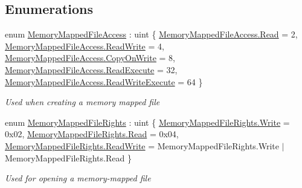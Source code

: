 \subsection*{Enumerations}
\begin{DoxyCompactItemize}
\item 
enum \hyperlink{namespace_system_1_1_i_o_1_1_memory_mapped_files_a19b0f6344fc0a0d04c0f781e1811c976}{Memory\+Mapped\+File\+Access} \+: uint \{ \newline
\hyperlink{namespace_system_1_1_i_o_1_1_memory_mapped_files_a19b0f6344fc0a0d04c0f781e1811c976a7a1a5f3e79fdc91edf2f5ead9d66abb4}{Memory\+Mapped\+File\+Access.\+Read} = 2, 
\hyperlink{namespace_system_1_1_i_o_1_1_memory_mapped_files_a19b0f6344fc0a0d04c0f781e1811c976a70a2a84088d405a2e3f1e3accaa16723}{Memory\+Mapped\+File\+Access.\+Read\+Write} = 4, 
\hyperlink{namespace_system_1_1_i_o_1_1_memory_mapped_files_a19b0f6344fc0a0d04c0f781e1811c976aad9dd22a4a58cbbaaffd8e73443064c3}{Memory\+Mapped\+File\+Access.\+Copy\+On\+Write} = 8, 
\hyperlink{namespace_system_1_1_i_o_1_1_memory_mapped_files_a19b0f6344fc0a0d04c0f781e1811c976a847478398fca6833e50a3ba5255eb2bf}{Memory\+Mapped\+File\+Access.\+Read\+Execute} = 32, 
\newline
\hyperlink{namespace_system_1_1_i_o_1_1_memory_mapped_files_a19b0f6344fc0a0d04c0f781e1811c976a68fbe19a33b2eec8657b4ec31a38ad94}{Memory\+Mapped\+File\+Access.\+Read\+Write\+Execute} = 64
 \}\begin{DoxyCompactList}\small\item\em Used when creating a memory mapped file \end{DoxyCompactList}
\item 
enum \hyperlink{namespace_system_1_1_i_o_1_1_memory_mapped_files_a8b0c5fd6b9570a7bb25abe82c36208e5}{Memory\+Mapped\+File\+Rights} \+: uint \{ \hyperlink{namespace_system_1_1_i_o_1_1_memory_mapped_files_a8b0c5fd6b9570a7bb25abe82c36208e5a1129c0e4d43f2d121652a7302712cff6}{Memory\+Mapped\+File\+Rights.\+Write} = 0x02, 
\hyperlink{namespace_system_1_1_i_o_1_1_memory_mapped_files_a8b0c5fd6b9570a7bb25abe82c36208e5a7a1a5f3e79fdc91edf2f5ead9d66abb4}{Memory\+Mapped\+File\+Rights.\+Read} = 0x04, 
\hyperlink{namespace_system_1_1_i_o_1_1_memory_mapped_files_a8b0c5fd6b9570a7bb25abe82c36208e5a70a2a84088d405a2e3f1e3accaa16723}{Memory\+Mapped\+File\+Rights.\+Read\+Write} = Memory\+Mapped\+File\+Rights.\+Write $\vert$ Memory\+Mapped\+File\+Rights.\+Read
 \}\begin{DoxyCompactList}\small\item\em Used for opening a memory-\/mapped file \end{DoxyCompactList}
\end{DoxyCompactItemize}


